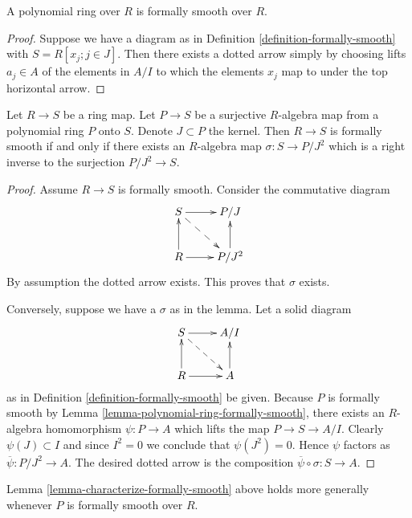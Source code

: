 \begin{lemma}
\label{lemma-polynomial-ring-formally-smooth}
A polynomial ring over $R$ is formally smooth over $R$.
\end{lemma}

\begin{proof}
Suppose we have a diagram as in Definition \ref{definition-formally-smooth}
with $S = R[x_j; j \in J]$. Then there exists a dotted arrow
simply by choosing lifts $a_j \in A$ of the elements in $A/I$
to which the elements $x_j$ map to under the top horizontal arrow.
\end{proof}

\begin{lemma}
\label{lemma-characterize-formally-smooth}
Let $R \to S$ be a ring map.
Let $P \to S$ be a surjective $R$-algebra map from a
polynomial ring $P$ onto $S$. Denote $J \subset P$ the
kernel. Then $R \to S$ is formally smooth if and only
if there exists an $R$-algebra map $\sigma : S \to P/J^2$
which is a right inverse to the surjection
$P/J^2 \to S$.
\end{lemma}

\begin{proof}
Assume $R \to S$ is formally smooth.
Consider the commutative diagram
$$
\xymatrix{
S \ar[r] \ar@{-->}[rd] & P/J \\
R \ar[r] \ar[u] &  P/J^2\ar[u]
}
$$
By assumption the dotted arrow exists. This proves that
$\sigma$ exists.

\medskip\noindent
Conversely, suppose we have a $\sigma$ as in the lemma.
Let a solid diagram
$$
\xymatrix{
S \ar[r] \ar@{-->}[rd] & A/I \\
R \ar[r] \ar[u] & A \ar[u]
}
$$
as in Definition \ref{definition-formally-smooth} be given.
Because $P$ is formally smooth by
Lemma \ref{lemma-polynomial-ring-formally-smooth},
there exists an $R$-algebra homomorphism
$\psi : P \to A$ which lifts the map $P \to S \to A/I$.
Clearly $\psi(J) \subset I$ and since $I^2 = 0$ we conclude that
$\psi(J^2) = 0$. Hence $\psi$ factors as
$\overline{\psi} : P/J^2 \to A$. The desired dotted arrow
is the composition $\overline{\psi} \circ \sigma : S \to A$.
\end{proof}

\begin{remark}
\label{remark-lemma-characterize-formally-smooth}
Lemma \ref{lemma-characterize-formally-smooth} above holds more
generally whenever $P$ is formally smooth over $R$.
\end{remark}

